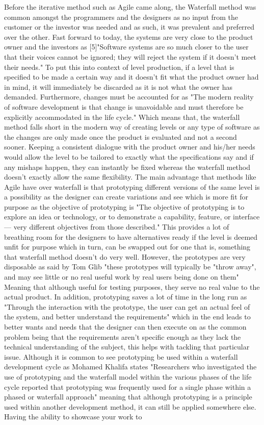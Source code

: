 \documentclass{scrartcl}
\begin{document}
Before the iterative method such as Agile came along, the Waterfall method was common amongst the programmers and the designers as no input from the customer or the investor was needed and as such, it was prevalent and preferred over the other. Fast forward to today, the systems are very close to the product owner and the investors as \cite{5} [5]"Software systems are so much closer to the user that their voices cannot be ignored; they will reject the system if it doesn't meet their needs." To put this into context of level production, if a level that is specified to be made a certain way and it doesn't fit what the product owner had in mind, it will immediately be discarded as it is not what the owner has demanded. Furthermore, changes must be accounted for as \cite{5}"The modern reality of software development is that change is unavoidable and must therefore be explicitly accommodated in the life cycle." Which means that, the waterfall method falls short in the modern way of creating levels or any type of software as the changes are only made once the product is evaluated and not a second sooner. Keeping a consistent dialogue with the product owner and his/her needs would allow the level to be tailored to exactly what the specifications say and if any mishaps happen, they can instantly be fixed whereas the waterfall method doesn't exactly allow the same flexibility. The main advantage that methods like Agile have over waterfall is that prototyping different versions of the same level is a possibility as the designer can create variations and see which is more fit for purpose as the objective of prototyping is \cite{5} "The objective of prototyping is to explore an idea or technology, or to demonstrate a capability, feature, or interface — very different objectives from those described." This provides a lot of breathing room for the designers to have alternatives ready if the level is deemed unfit for purpose which in turn, can be swapped out for one that is, something that waterfall method doesn't do very well. However, the prototypes are very disposable as said by Tom Glib \cite{6} "these prototypes will typically be "throw away", and may see little or no real useful work by real users being done on them" Meaning that although useful for testing purposes, they serve no real value to the actual product. In addition, prototyping saves a lot of time in the long run as \cite{7}"Through the interaction with the prototype, the user can get an actual feel of the system, and better understand the requirements" which in the end leads to better wants and needs that the designer can then execute on as the common problem being that the requirements aren't specific enough as they lack the technical understanding of the subject, this helps with tackling that particular issue. Although it is common to see prototyping be used within a waterfall development cycle as \cite{7} Mohamed Khalifa states "Researchers who investigated the use of prototyping and the waterfall model within the various phases of the life cycle reported that prototyping was frequently used for a single phase within a phased or waterfall approach" meaning that although prototyping is a principle used within another development method, it can still be applied somewhere else. Having the ability to showcase your work to 
\end{document}
